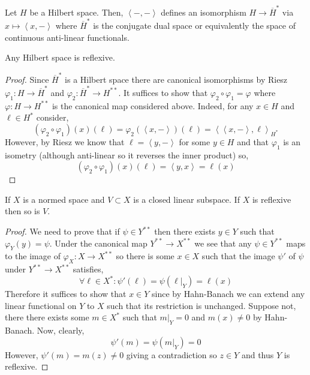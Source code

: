 \documentclass[12pt]{article}
\newcommand{\inner}[2]{\left< #1, #2 \right>}
\begin{document}
\begin{thm}[Riesz]
Let $H$ be a Hilbert space. Then, $\inner{-}{-}$ defines an isomorphism $H \to \overline{H}^*$ via $x \mapsto \inner{x}{-}$ where $\overline{H}^*$ is the conjugate dual space or equivalently the space of continuous anti-linear functionals.
\end{thm}

\begin{cor}
Any Hilbert space is reflexive.
\end{cor}

\begin{proof}
Since $\overline{H}^*$ is a Hilbert space there are canonical isomorphisms by Riesz $\varphi_1 : H \to \overline{H}^*$ and $\varphi_2 : \overline{H}^* \to H^{**}$. It suffices to show that $\varphi_2 \circ \varphi_1 = \varphi$ where $\varphi : H \to H^{**}$ is the canonical map considered above. Indeed, for any $x \in H$ and $\ell \in H^*$ consider,
\[ (\varphi_2 \circ \varphi_1)(x)(\ell) = \varphi_2(\inner{x}{-})(\ell) = \inner{\inner{x}{-}}{\ell}_{H^*} \]
However, by Riesz we know that $\ell = \inner{y}{-}$ for some $y \in H$ and that $\varphi_1$ is an isometry (although anti-linear so it reverses the inner product) so,
\[ (\varphi_2 \circ \varphi_1)(x)(\ell) = \inner{y}{x} = \ell(x) \]
\end{proof}

\begin{prop}
If $X$ is a normed space and $V \subset X$ is a closed linear subspace. If $X$ is reflexive then so is $V$.
\end{prop}

\begin{proof}
We need to prove that if $\psi \in Y^{**}$ then there exists $y \in Y$ such that $\varphi_Y(y) = \psi$. Under the canonical map $Y^{**} \to X^{**}$ we see that any $\psi \in Y^{**}$ maps to the image of $\varphi_X : X \to X^{**}$ so there is some $x \in X$ such that the image $\psi'$ of $\psi$ under $Y^{**} \to X^{**}$ satisfies,
\[ \forall \ell \in X^* : \psi'(\ell) = \psi(\ell|_Y) = \ell(x) \]
Therefore it suffices to show that $x \in Y$ since by Hahn-Banach we can extend any linear functional on $Y$ to $X$ such that its restriction is unchanged. Suppose not, there there exists some $m \in X^*$ such that $m|_Y = 0$ and $m(x) \neq 0$ by Hahn-Banach. Now, clearly,
\[ \psi'(m) = \psi(m|_Y) = 0 \]
However, $\psi'(m) = m(z) \neq 0$ giving a contradiction so $z \in Y$ and thus $Y$ is reflexive.
\end{proof}
\end{document}
